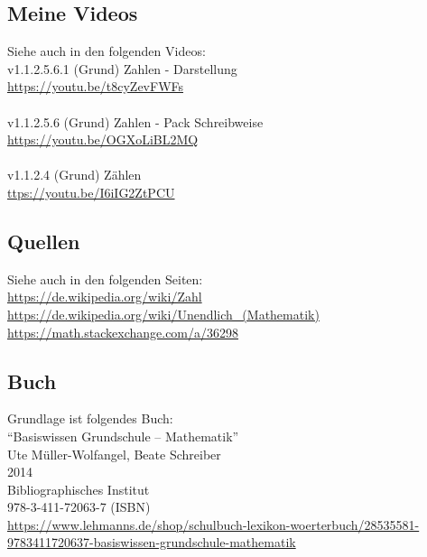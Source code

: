 \documentclass[a4paper]{amsart}
\theoremstyle{definition}
\begin{document}
\subsection*{Meine Videos}
Siehe auch in den folgenden Videos:\\
v1.1.2.5.6.1 (Grund) Zahlen - Darstellung\\
\url{https://youtu.be/t8cyZevFWFs}\\
\\
v1.1.2.5.6 (Grund) Zahlen - Pack Schreibweise\\
\url{https://youtu.be/OGXoLiBL2MQ}\\
\\
v1.1.2.4 (Grund) Zählen\\
\url{ttps://youtu.be/I6iIG2ZtPCU}\\

\subsection*{Quellen}
Siehe auch in den folgenden Seiten:\\
\url{https://de.wikipedia.org/wiki/Zahl}\\
\url{https://de.wikipedia.org/wiki/Unendlich_(Mathematik)}\\
\url{https://math.stackexchange.com/a/36298}

\subsection*{Buch}
Grundlage ist folgendes Buch:\\
"`Basiswissen Grundschule – Mathematik"'\\
Ute Müller-Wolfangel, Beate Schreiber\\
2014\\
Bibliographisches Institut\\
978-3-411-72063-7 (ISBN)
\\
\url{https://www.lehmanns.de/shop/schulbuch-lexikon-woerterbuch/28535581-9783411720637-basiswissen-grundschule-mathematik}
\end{document}
